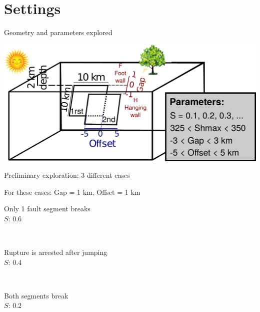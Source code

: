 \documentclass{beamer}
\begin{document}
\section{Settings}

\begin{frame}
 {Geometry and parameters explored}
 
  \includegraphics[width=1\linewidth]{images/schematic_view_param_new}
 
 \hfill {\tiny \citep[www.seissol.org; e.g.,][]{Wollherr_2018_OFP, Ulrich_2019_CPB}}
 
\end{frame}


\begin{frame}
 {Preliminary exploration: 3 different cases}

 \begin{center}
 For these cases: Gap = 1 km, Offset = 1 km \\
 \vskip 0.4cm
 \begin{minipage}{0.48\linewidth}
    \centering \small Only 1 fault segment breaks \\
  	$S$: 0.6
 \end{minipage} \,
 \begin{minipage}{0.48\linewidth}
    \centering \small Rupture is arrested after jumping \\
  	$S$: 0.4
 \end{minipage} \\
 \vskip 0.5cm
 \begin{minipage}{0.45\linewidth}
    \centering \small Both segments break \\
  	$S$: 0.2
 \end{minipage}
 \end{center}
 \addtocounter{framenumber}{-1}
  
\end{frame}
\end{document}
